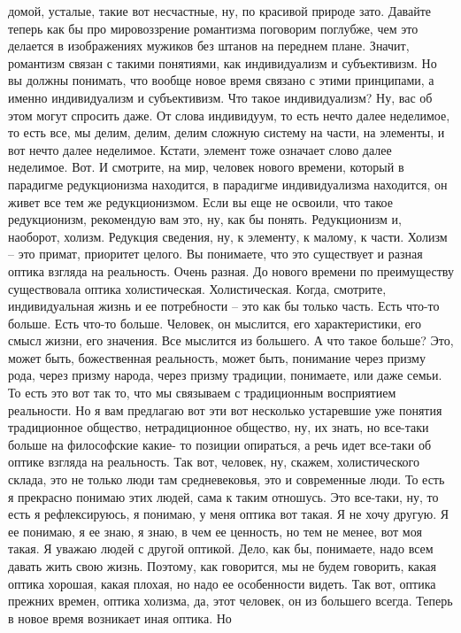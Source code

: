 домой, усталые, такие вот несчастные, ну, по красивой природе зато. Давайте
теперь как бы про мировоззрение романтизма поговорим поглубже, чем это делается
в изображениях мужиков без штанов на переднем плане. Значит, романтизм связан с
такими понятиями, как индивидуализм и субъективизм. Но вы должны понимать, что
вообще новое время связано с этими принципами, а именно индивидуализм и
субъективизм. Что такое индивидуализм? Ну, вас об этом могут спросить даже. От
слова индивидуум, то есть нечто далее неделимое, то есть все, мы делим, делим,
делим сложную систему на части, на элементы, и вот нечто далее неделимое.
Кстати, элемент тоже означает слово далее неделимое. Вот. И смотрите, на мир,
человек нового времени, который в парадигме редукционизма находится, в парадигме
индивидуализма находится, он живет все тем же редукционизмом. Если вы еще не
освоили, что такое редукционизм, рекомендую вам это, ну, как бы понять.
Редукционизм и, наоборот, холизм. Редукция сведения, ну, к элементу, к малому, к
части. Холизм – это примат, приоритет целого. Вы понимаете, что это существует и
разная оптика взгляда на реальность. Очень разная. До нового времени по
преимуществу существовала оптика холистическая. Холистическая. Когда, смотрите,
индивидуальная жизнь и ее потребности – это как бы только часть. Есть что-то
больше. Есть что-то больше. Человек, он мыслится, его характеристики, его смысл
жизни, его значения. Все мыслится из большего. А что такое больше? Это, может
быть, божественная реальность, может быть, понимание через призму рода, через
призму народа, через призму традиции, понимаете, или даже семьи. То есть это вот
так то, что мы связываем с традиционным восприятием реальности. Но я вам
предлагаю вот эти вот несколько устаревшие уже понятия традиционное общество,
нетрадиционное общество, ну, их знать, но все-таки больше на философские какие-
то позиции опираться, а речь идет все-таки об оптике взгляда на реальность. Так
вот, человек, ну, скажем, холистического склада, это не только люди там
средневековья, это и современные люди. То есть я прекрасно понимаю этих людей,
сама к таким отношусь. Это все-таки, ну, то есть я рефлексируюсь, я понимаю, у
меня оптика вот такая. Я не хочу другую. Я ее понимаю, я ее знаю, я знаю, в чем
ее ценность, но тем не менее, вот моя такая. Я уважаю людей с другой оптикой.
Дело, как бы, понимаете, надо всем давать жить свою жизнь. Поэтому, как
говорится, мы не будем говорить, какая оптика хорошая, какая плохая, но надо ее
особенности видеть. Так вот, оптика прежних времен, оптика холизма, да, этот
человек, он из большего всегда. Теперь в новое время возникает иная оптика. Но

